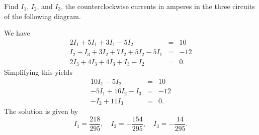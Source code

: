\begin{ex} Find $I_1$, $I_2$, and $I_3$, the counterclockwise currents in
  amperes in the three circuits of the following diagram.

  \begin{center}
  \end{center}

  \begin{sol}
    We have
    \begin{eqnarray*}
      2I_1 + 5I_1 + 3I_1 - 5I_2 &=& 10 \\
      I_2 - I_3 + 3I_2 + 7I_2 + 5I_2 - 5I_1 &=& -12 \\
      2I_3 + 4I_3 + 4I_3 + I_3 - I_2 &=& 0.
    \end{eqnarray*}
    Simplifying this yields
    \begin{eqnarray*}
      10I_1 - 5I_2 &=& 10 \\
      -5I_1 + 16I_2 - I_3 &=& -12 \\
      -I_2 + 11I_3 &=& 0.
    \end{eqnarray*}
    The solution is given by
    \begin{equation*}
      I_1 = \frac{218}{295},\quad
      I_2 = -\frac{154}{295},\quad
      I_3 = -\frac{14}{295}.
    \end{equation*}

  \end{sol}
\end{ex}

